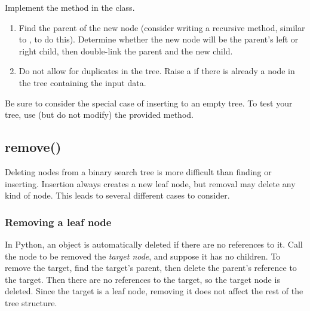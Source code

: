\begin{problem}
Implement the  method in the  class.
\begin{enumerate}
\item Find the parent of the new node (consider writing a recursive method, similar to , to do this).
Determine whether the new node will be the parent's left or right child, then double-link the parent and the new child.
\item Do not allow for duplicates in the tree. Raise a  if there is already a node in the tree containing the input data.
\end{enumerate}
Be sure to consider the special case of inserting to an empty tree.
To test your tree, use (but do not modify) the provided  method.
\end{problem}

\subsection*{remove()}

Deleting nodes from a binary search tree is more difficult than finding or inserting.
Insertion always creates a new leaf node, but removal may delete any kind of node.
This leads to several different cases to consider.

\subsubsection*{Removing a leaf node}

In Python, an object is automatically deleted if there are no references to it.
Call the node to be removed the \emph{target node}, and suppose it has no children.
To remove the target, find the target's parent, then delete the parent's reference to the target.
Then there are no references to the target, so the target node is deleted.
Since the target is a leaf node, removing it does not affect the rest of the tree structure.

